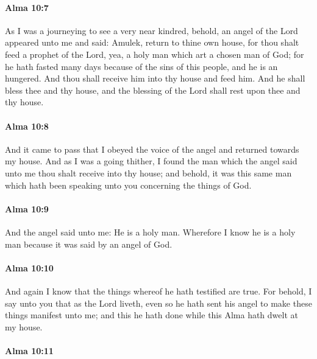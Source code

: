 		\paragraph{Alma 10:7} %
			\label{ALMA-10-7}

			As I was a journeying to see a very near kindred,
			behold, an angel of the Lord appeared unto me and said:
			Amulek, return to thine own house,
			for thou shalt feed a prophet of the Lord,
			yea, a holy man which art a chosen man of God;
			for he hath fasted many days because of the sins of this people,
			and he is an hungered.
			And thou shall receive him into thy house and feed him.
			And he shall bless thee and thy house,
			and the blessing of the Lord shall rest upon thee and thy house.

		\paragraph{Alma 10:8} %
			\label{ALMA-10-8}

			And it came to pass that I obeyed the voice of the angel
			and returned towards my house.
			And as I was a going thither,
			I found the man which the angel said unto me
			thou shalt receive into thy house;
			and behold, it was this same man
			which hath been speaking unto you concerning the things of God.

		\paragraph{Alma 10:9} %
			\label{ALMA-10-9}

			And the angel said unto me:
			He is a holy man.
			Wherefore I know he is a holy man
			because it was said by an angel of God.

		\paragraph{Alma 10:10} %
			\label{ALMA-10-10}

			And again I know that the things whereof he hath testified are true.
			For behold, I say unto you that as the Lord liveth,
			even so he hath sent his angel to make these things manifest unto me;
			and this he hath done while this Alma hath dwelt at my house.

		\paragraph{Alma 10:11} %
			\label{ALMA-10-11}

